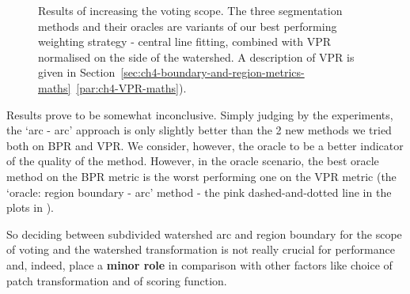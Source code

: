 \begin{figure}[ht!]
\centering
\caption[Increasing the voting scope - plots]{Results of increasing the voting scope. The three segmentation methods and their oracles are variants of our best performing weighting strategy - central line fitting, combined with VPR normalised on the side of the watershed. A description of VPR is given in Section~\ref*{sec:ch4-boundary-and-region-metrics-maths}~\ref{par:ch4-VPR-maths}).}
\label{fig:voting-scope-line-centre-VPR-ws}
\end{figure}

Results prove to be somewhat inconclusive. Simply judging by the experiments, the `arc - arc' approach is only slightly %
better than the 2 new methods we tried both on BPR and VPR. We consider, however, the oracle to be a better indicator of the quality of the method. However, in the oracle scenario, the best oracle method on the BPR metric is the worst performing one on the VPR metric (the `oracle: region boundary - arc' method - the pink dashed-and-dotted line in the plots in ).

So deciding between subdivided watershed arc and region boundary for the scope of voting and the watershed transformation is not really crucial for performance and, indeed, place a {\bf minor role} in comparison with other factors like choice of patch transformation and of scoring function.

